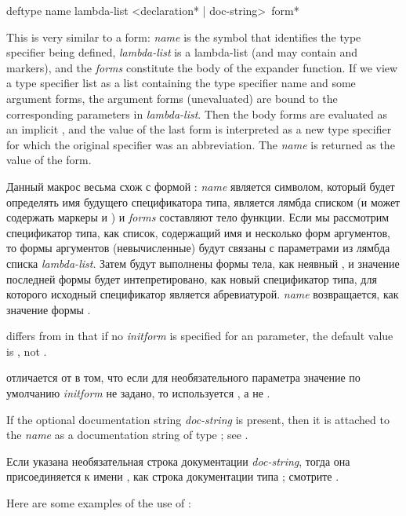 \begin{defmac}
deftype name lambda-list <{declaration}* | doc-string> {\,form}*

This is very similar to a  form: \emph{name} is the
symbol that identifies the type specifier being defined, \emph{lambda-list} is
a lambda-list (and may contain  and 
markers), and
the \emph{forms} constitute the body of the expander function.  If we view a
type specifier list as a list containing the type specifier name and some argument forms,
the argument forms (unevaluated) are bound to the corresponding
parameters in \emph{lambda-list}.  Then the body forms are evaluated
as an implicit , and the value of the last form
is interpreted as a new type specifier for which the original specifier
was an abbreviation.  The \emph{name} is returned as the value of the
 form.

Данный макрос весьма схож с формой : \emph{name} является
символом, который будет определять имя будущего спецификатора типа,
 является лямбда списком (и может содержать маркеры  и
) и \emph{forms} составляют тело функции. Если мы рассмотрим
спецификатор типа, как список, содержащий имя и несколько форм аргументов, то
формы аргументов (невычисленные) будут связаны с параметрами из лямбда списка
\emph{lambda-list}. Затем будут выполнены формы тела, как неявный ,
и значение последней формы будет интепретировано, как новый спецификатор типа,
для которого исходный спецификатор является абревиатурой. \emph{name}
возвращается, как значение формы .

 differs from  in that if no \emph{initform}
is specified for an  parameter, the default value
is \cdf{*}, not {\nil}.

 отличается от  в том, что если для необязательного 
параметра значение по умолчанию \emph{initform} не задано, то используется
\cdf{*}, а не {\nil}.

If the optional documentation string \emph{doc-string} is present,
then it is attached to the \emph{name}
as a documentation string of type ; see .

Если указана необязательная строка документации \emph{doc-string}, тогда она
присоединяется к имени , как строка документации типа ;
смотрите .

Here are some examples of the use of :


\end{defmac}
